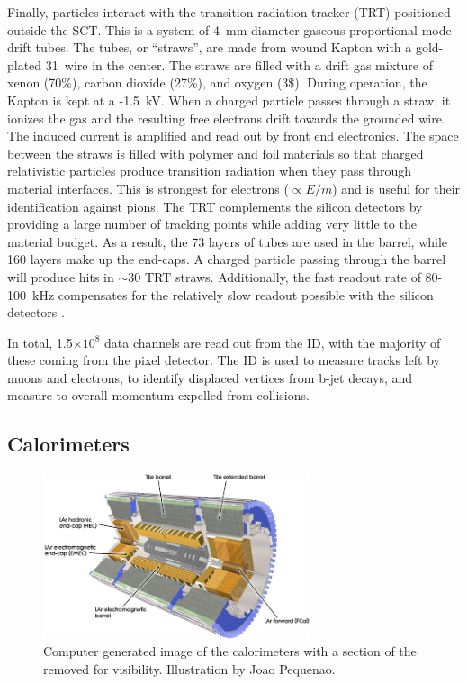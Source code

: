 Finally, particles interact with the transition radiation tracker (TRT) positioned outside the SCT.
This is a system of 4~mm diameter gaseous proportional-mode drift tubes.
The tubes, or ``straws'', are made from wound Kapton with a gold-plated 31~\um wire in the center.
The straws are filled with a drift gas mixture of xenon (70\%), carbon dioxide (27\%), and oxygen (3\$).
During operation, the Kapton is kept at a -1.5~kV.
When a charged particle passes through a straw, it ionizes the gas and the resulting free electrons drift towards the grounded wire.
The induced current is amplified and read out by front end electronics.
The space between the straws is filled with polymer and foil materials so that charged relativistic particles produce transition radiation when they pass through material interfaces.
This is strongest for electrons ($\propto E/m$) and is useful for their identification against pions.
The TRT complements the silicon detectors by providing a large number of tracking points while adding very little to the material budget.
As a result, the 73 layers of tubes are used in the barrel, while 160 layers make up the end-caps.
A charged particle passing through the barrel will produce hits in $\sim30$ TRT straws.
Additionally, the fast readout rate of 80-100~kHz compensates for the relatively slow readout possible with the silicon detectors  \cite{trt}.

In total, 1.5$\times10^{8}$ data channels are read out from the ID, with the majority of these coming from the pixel detector.
The ID is used to measure tracks left by muons and electrons, to identify displaced vertices from b-jet decays, and measure to overall momentum expelled from collisions.

\subsection{Calorimeters}

\begin{figure}[h!]
\captionsetup[subfigure]{position=b}
\centering
\includegraphics[width=0.7\textwidth]{figures/experiment/atlas/calo.jpg}
\caption[Computer generated image of the calorimeters with a section of the removed for visibility. Illustration by Joao Pequenao. ]{Computer generated image of the calorimeters with a section of the removed for visibility. Illustration by Joao Pequenao\footnotemark. }
\label{fig:atlasCalo}
\end{figure}

